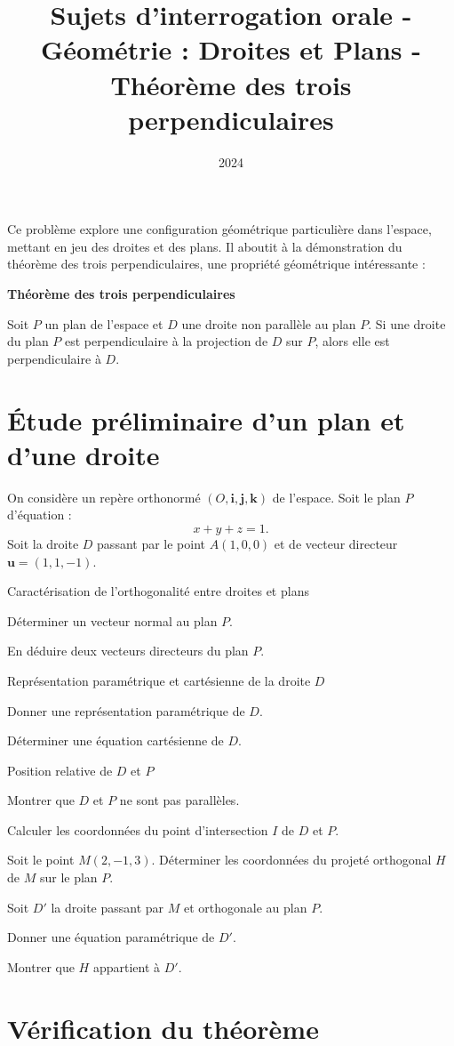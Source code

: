 \documentclass[10pt,a4paper]{article}
\title{Sujets d'interrogation orale - Géométrie : Droites et Plans - Théorème des trois perpendiculaires}
\author{}
\date{2024}
\begin{document}
Ce problème explore une configuration géométrique particulière dans l'espace, mettant en jeu des
droites et des plans. Il aboutit à la démonstration du théorème des trois perpendiculaires, une
propriété géométrique intéressante :

\begin{center}
\textbf{Théorème des trois perpendiculaires}

Soit $P$ un plan de l'espace et $D$ une droite non parallèle au plan $P$. Si une droite du plan $P$ est
perpendiculaire à la projection de $D$ sur $P$, alors elle est perpendiculaire à $D$.
\end{center}

\section{Étude préliminaire d'un plan et d'une droite}

On considère un repère orthonormé $(O, \mathbf{i}, \mathbf{j}, \mathbf{k})$ de l'espace. Soit le
plan $P$ d'équation :
   \[
   x + y + z = 1.
   \]
Soit la droite $D$ passant par le point $A(1, 0, 0)$ et de vecteur directeur
$\mathbf{u} = (1,1,-1)$.

\q Caractérisation de l'orthogonalité entre droites et plans
\setcounter{ql}{0}

\ql Déterminer un vecteur normal au plan $P$.

\ql En déduire deux vecteurs directeurs du plan $P$.

\q Représentation paramétrique et cartésienne de la droite $D$
\setcounter{ql}{0}

\ql Donner une représentation paramétrique de $D$.

\ql Déterminer une équation cartésienne de $D$.

\q Position relative de $D$ et $P$
\setcounter{ql}{0}

\ql Montrer que $D$ et $P$ ne sont pas parallèles.

\ql Calculer les coordonnées du point d'intersection $I$ de $D$ et $P$.

\q Soit le point $M(2, -1, 3)$. Déterminer les coordonnées du projeté orthogonal $H$ de $M$ sur le
plan $P$.

\q Soit $D'$ la droite passant par $M$ et orthogonale au plan $P$.
\setcounter{ql}{0}

\ql Donner une équation paramétrique de $D'$.

\ql Montrer que $H$ appartient à $D'$.


\section{Vérification du théorème}
\end{document}
